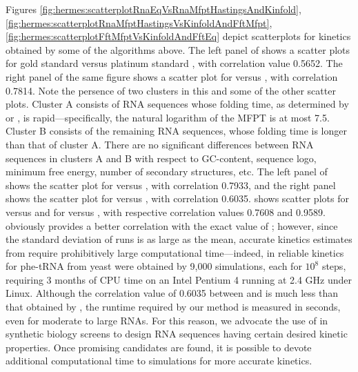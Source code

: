 Figures \ref{fig:hermes:scatterplotRnaEqVsRnaMfptHastingsAndKinfold},
\ref{fig:hermes:scatterplotRnaMfptHastingsVsKinfoldAndFftMfpt},
\ref{fig:hermes:scatterplotFftMfptVsKinfoldAndFftEq}
depict scatterplots for kinetics obtained by some of the algorithms
above. The left panel of
shows a scatter plots for gold standard \rnamfpt versus platinum
standard \rnaeq, with correlation value 0.5652. The right
panel of the same figure shows a scatter plot for \kinfold versus
\rnaeq, with correlation 0.7814. Note the persence of two
clusters in this and some of the other scatter plots. Cluster A
consists of RNA sequences whose folding time, as determined by \rnamfpt
or \rnaeq, is rapid---specifically, the natural
logarithm of the MFPT is at most 7.5. Cluster B consists of the
remaining RNA sequences, whose folding time is longer than that of
cluster A. There are no significant differences between RNA sequences
in clusters A and B with respect to GC-content, sequence logo, minimum
free energy, number of secondary structures, etc.  The left panel of
shows the scatter plot for \rnamfpt versus \kinfold, with
correlation 0.7933, and the right panel shows the scatter plot for
\rnamfpt versus \fftmfpt, with correlation 0.6035.
shows scatter plots for \fftmfpt versus  and
for \fftmfpt versus , with respective
correlation values 0.7608 and 0.9589. \kinfold obviously provides
a better correlation with the exact value of \mfpt;
however, since the standard deviation of \kinfold runs is as
large as the mean, accurate kinetics estimates
from \kinfold require prohibitively large computational time---indeed, in
\citep{wolfingerstadler:kinetics} reliable kinetics for phe-tRNA from
yeast were obtained by 9,000 \kinfold simulations, each for $10^8$
steps, requiring 3 months of CPU time on an Intel Pentium 4 running at
2.4 GHz under Linux. Although the correlation value of 0.6035 between
\rnamfpt and \fftmfpt is much less than that obtained by \kinfold,
the runtime required by our method \fftmfpt is measured
in seconds, even for moderate to large RNAs. For this reason, we
advocate the use of \fftmfpt in synthetic biology screens to
design RNA sequences having certain desired kinetic properties. Once
promising candidates are found, it is possible to devote additional
computational time to \kinfold simulations for more accurate
kinetics.


